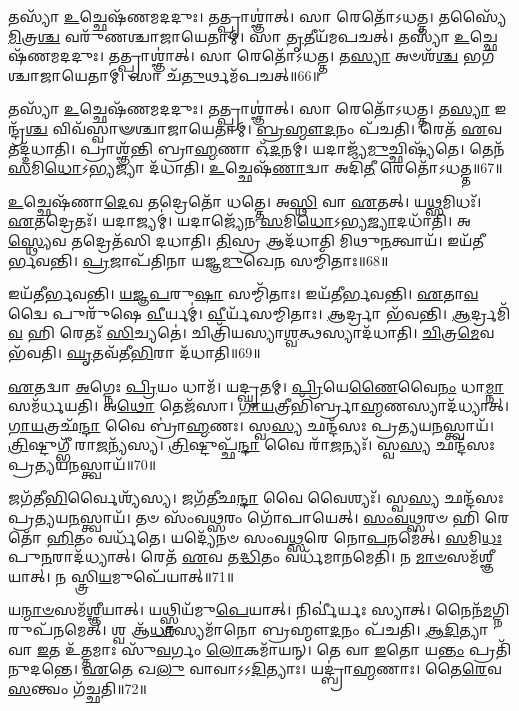 𑌤𑌸𑍍𑌯𑌾᳴ \ul{𑌉}\-𑌚𑍍𑌛𑍇𑌷᳴𑌣𑌮𑌦𑌦𑍁𑌃।
𑌤𑌤𑍍𑌪𑍍𑌰𑌾𑌶𑍍𑌞𑌾॑𑌤𑍍।
𑌸𑌾 𑌰𑍇𑌤𑍋᳴\-𑌽𑌧𑌤𑍍𑌤।
𑌤𑌸𑍍𑌯𑍈᳴ \ul{𑌮𑌿}\-𑌤𑍍𑌰\-\ul{𑌶𑍍𑌚} 𑌵𑌰𑍁᳴𑌣𑌶𑍍𑌚𑌾𑌜𑌾𑌯𑍇𑌤𑌾𑌮𑍍।
𑌸𑌾 \ul{𑌤𑍃}\-𑌤𑍀𑌯᳴𑌮𑌪𑌚𑌤𑍍।
𑌤𑌸𑍍𑌯𑌾᳴ \ul{𑌉}\-𑌚𑍍𑌛𑍇𑌷᳴𑌣𑌮𑌦𑌦𑍁𑌃।
𑌤𑌤𑍍𑌪𑍍𑌰𑌾𑌶𑍍𑌞𑌾॑𑌤𑍍।
𑌸𑌾 𑌰𑍇𑌤𑍋᳴\-𑌽𑌧𑌤𑍍𑌤।
𑌤\-\ul{𑌸𑍍𑌯𑌾} 𑌅𑍞𑌶᳴\-\ul{𑌶𑍍𑌚} 𑌭𑌗᳴𑌶𑍍𑌚𑌾𑌜𑌾𑌯𑍇𑌤𑌾𑌮𑍍।
𑌸𑌾 𑌚᳴\-\ul{𑌤𑍁}\-𑌰𑍍𑌥𑌮᳴𑌪𑌚𑌤𑍍॥66॥

𑌤𑌸𑍍𑌯𑌾᳴ \ul{𑌉}\-𑌚𑍍𑌛𑍇𑌷᳴𑌣𑌮𑌦𑌦𑍁𑌃।
𑌤𑌤𑍍𑌪𑍍𑌰𑌾𑌶𑍍𑌞𑌾॑𑌤𑍍।
𑌸𑌾 𑌰𑍇𑌤𑍋᳴\-𑌽𑌧𑌤𑍍𑌤।
𑌤\-\ul{𑌸𑍍𑌯𑌾} 𑌇𑌨𑍍𑌦𑍍𑌰᳴\-\ul{𑌶𑍍𑌚} 𑌵𑌿𑌵᳴𑌸𑍍𑌵𑌾𑍟𑌶𑍍𑌚𑌾𑌜𑌾𑌯𑍇𑌤𑌾𑌮𑍍।
\-\ul{𑌬𑍍𑌰}\-\-\ul{𑌹𑍍𑌮𑍗}\-\-\ul{𑌦}\-𑌨𑌂 𑌪᳴𑌚𑌤𑌿।
𑌰𑍇𑌤᳴ \ul{𑌏}\-𑌵 𑌤𑌦𑍍𑌦᳴𑌧𑌾𑌤𑌿।
𑌪𑍍𑌰𑌾𑌶𑍍𑌞᳴𑌨𑍍𑌤𑌿 𑌬𑍍𑌰𑌾\-\ul{𑌹𑍍𑌮}\-𑌣𑌾 𑌓᳴\-\ul{𑌦}\-𑌨𑌮𑍍।
𑌯𑌦𑌾𑌜𑍍𑌯᳴\-\ul{𑌮𑍁}\-𑌚𑍍𑌛𑌿𑌷𑍍𑌯᳴𑌤𑍇।
𑌤𑍇𑌨᳴ \ul{𑌸}\-𑌮𑌿\-\ul{𑌧𑍋}\-\-𑌽𑌭𑍍𑌯𑌜𑍍𑌯𑌾 𑌦᳴𑌧𑌾𑌤𑌿।
\-\ul{𑌉}\-𑌚𑍍𑌛𑍇𑌷᳴\-\ul{𑌣𑌾}\-𑌦𑍍𑌵𑌾 𑌅𑌦𑌿᳴\-\ul{𑌤𑍀} 𑌰𑍇𑌤𑍋᳴\-𑌽𑌧𑌤𑍍𑌤॥67॥

\-\ul{𑌉}\-𑌚𑍍𑌛𑍇𑌷᳴𑌣𑌾\-\ul{𑌦𑍇}\-𑌵 𑌤𑌦𑍍𑌰𑍇𑌤𑍋᳴ 𑌧𑌤𑍍𑌤𑍇।
𑌅\-\ul{𑌸𑍍𑌥𑌿} 𑌵𑌾 \ul{𑌏}\-𑌤𑌤𑍍।
𑌯\-\ul{𑌥𑍍𑌸}\-𑌮𑌿𑌧𑌃᳴।
\-\ul{𑌏}\-𑌤𑌦𑍍𑌰𑍇𑌤𑌃᳴।
𑌯𑌦𑌾𑌜𑍍𑌯𑌮𑍍॑।
𑌯𑌦𑌾𑌜𑍍𑌯𑍇᳴𑌨 \ul{𑌸}\-𑌮𑌿\-\ul{𑌧𑍋}\-\-𑌽𑌭𑍍𑌯\-\ul{𑌜𑍍𑌯𑌾}\-𑌦𑌧𑌾᳴𑌤𑌿।
𑌅\-\ul{𑌸𑍍𑌥𑍍𑌯𑍇}\-𑌵 𑌤𑌦𑍍𑌰𑍇𑌤᳴𑌸𑌿 𑌦𑌧𑌾𑌤𑌿।
\-\ul{𑌤𑌿}\-𑌸𑍍𑌰 𑌆𑌦᳴𑌧𑌾𑌤𑌿 𑌮𑌿𑌥𑍁\-\ul{𑌨}\-𑌤𑍍𑌵𑌾𑌯᳴।
𑌇𑌯᳴𑌤𑍀𑌰𑍍𑌭𑌵𑌨𑍍𑌤𑌿।
\-\ul{𑌪𑍍𑌰}\-𑌜𑌾𑌪᳴𑌤𑌿𑌨𑌾 𑌯𑌜𑍍𑌞\-\ul{𑌮𑍁}\-𑌖𑍇\-\ul{𑌨} 𑌸𑌮𑍍𑌮𑌿᳴𑌤𑌾𑌃॥68॥

𑌇𑌯᳴𑌤𑍀𑌰𑍍𑌭𑌵𑌨𑍍𑌤𑌿।
\-\ul{𑌯}\-\-\ul{𑌜𑍍𑌞}\-\-\ul{𑌪}\-𑌰𑍁\-\ul{𑌷𑌾} 𑌸𑌮𑍍𑌮𑌿᳴𑌤𑌾𑌃।
𑌇𑌯᳴𑌤𑍀𑌰𑍍𑌭𑌵𑌨𑍍𑌤𑌿।
\-\ul{𑌏}\-𑌤𑌾\-\ul{𑌵}\-𑌦𑍍𑌵𑍈 𑌪𑍁𑌰𑍁᳴𑌷𑍇 \ul{𑌵𑍀}\-𑌰𑍍𑌯𑌮𑍍॑।
\-\ul{𑌵𑍀}\-𑌰𑍍𑌯᳴𑌸𑌮𑍍𑌮𑌿𑌤𑌾𑌃।
\-\ul{𑌆}\-𑌰𑍍𑌦𑍍𑌰𑌾 𑌭᳴𑌵𑌨𑍍𑌤𑌿।
\-\ul{𑌆}\-𑌰𑍍𑌦𑍍𑌰𑌮𑌿᳴\-\ul{𑌵} 𑌹𑌿 𑌰𑍇𑌤𑌃᳴ \ul{𑌸𑌿}\-𑌚𑍍𑌯𑌤𑍇॑।
𑌚𑌿𑌤𑍍𑌰𑌿᳴𑌯𑌸𑍍𑌯𑌾\-\ul{𑌶𑍍𑌵}\-𑌤𑍍𑌥𑌸𑍍𑌯𑌾𑌦᳴𑌧𑌾𑌤𑌿।
\-\ul{𑌚𑌿}\-𑌤𑍍𑌰\-\ul{𑌮𑍇}\-𑌵 𑌭᳴𑌵𑌤𑌿।
\-\ul{𑌘𑍃}\-𑌤𑌵᳴𑌤𑍀\-\ul{𑌭𑌿}\-𑌰𑌾 𑌦᳴𑌧𑌾𑌤𑌿॥69॥

\-\ul{𑌏}\-𑌤𑌦𑍍𑌵𑌾 \ul{𑌅}\-𑌗𑍍𑌨𑍇𑌃 \ul{𑌪𑍍𑌰𑌿}\-𑌯𑌂 𑌧𑌾𑌮᳴।
𑌯𑌦𑍍\mbox{}\-\ul{𑌘𑍃}\-𑌤𑌮𑍍।
\-\ul{𑌪𑍍𑌰𑌿}\-𑌯𑍇\-\ul{𑌣𑍈}\-𑌵𑍈\-\ul{𑌨𑌂} 𑌧𑌾\-\ul{𑌮𑍍𑌨𑌾} 𑌸𑌮᳴𑌰𑍍𑌧𑌯𑌤𑌿।
𑌅\-\ul{𑌥𑍋} 𑌤𑍇𑌜᳴𑌸𑌾।
\-\ul{𑌗𑌾}\-\-\ul{𑌯}\-𑌤𑍍𑌰𑍀𑌭𑌿᳴𑌰𑍍𑌬𑍍𑌰𑌾\-\ul{𑌹𑍍𑌮}\-𑌣𑌸𑍍𑌯𑌾𑌦᳴𑌧𑍍𑌯𑌾𑌤𑍍।
\-\ul{𑌗𑌾}\-\-\ul{𑌯}\-𑌤𑍍𑌰𑌛᳴\-\ul{𑌨𑍍𑌦𑌾} 𑌵𑍈 𑌬𑍍𑌰𑌾॑\-\ul{𑌹𑍍𑌮}\-𑌣𑌃।
𑌸𑍍𑌵\-\ul{𑌸𑍍𑌯} 𑌛𑌨𑍍𑌦᳴𑌸𑌃 𑌪𑍍𑌰𑌤𑍍𑌯𑌯\-\ul{𑌨}\-𑌸𑍍𑌤𑍍𑌵𑌾𑌯᳴।
\-\ul{𑌤𑍍𑌰𑌿}\-𑌷𑍍𑌟𑍁𑌗𑍍𑌭𑍀᳴ 𑌰𑌾\-\ul{𑌜}\-𑌨𑍍𑌯᳴𑌸𑍍𑌯।
\-\ul{𑌤𑍍𑌰𑌿}\-𑌷𑍍𑌟𑍁𑌪𑍍𑌛᳴\-\ul{𑌨𑍍𑌦𑌾} 𑌵𑍈 𑌰𑌾᳴\-\ul{𑌜}\-𑌨𑍍𑌯𑌃᳴।
𑌸𑍍𑌵\-\ul{𑌸𑍍𑌯} 𑌛𑌨𑍍𑌦᳴𑌸𑌃 𑌪𑍍𑌰𑌤𑍍𑌯𑌯\-\ul{𑌨}\-𑌸𑍍𑌤𑍍𑌵𑌾𑌯᳴॥70॥

𑌜𑌗᳴𑌤𑍀\-\ul{𑌭𑌿}\-𑌰𑍍𑌵𑍈𑌶𑍍𑌯᳴𑌸𑍍𑌯।
𑌜𑌗᳴𑌤𑍀𑌛\-\ul{𑌨𑍍𑌦𑌾} 𑌵𑍈 𑌵𑍈𑌶𑍍𑌯𑌃᳴।
𑌸𑍍𑌵\-\ul{𑌸𑍍𑌯} 𑌛𑌨𑍍𑌦᳴𑌸𑌃 𑌪𑍍𑌰𑌤𑍍𑌯𑌯\-\ul{𑌨}\-𑌸𑍍𑌤𑍍𑌵𑌾𑌯᳴।
𑌤𑍞 𑌸𑌂᳴𑌵\-\ul{𑌥𑍍𑌸}\-𑌰𑌂 𑌗𑍋᳴𑌪𑌾𑌯𑍇𑌤𑍍।
\-\ul{𑌸𑌂}\-\-\ul{𑌵}\-\-\ul{𑌥𑍍𑌸}\-𑌰𑍞 𑌹𑌿 𑌰𑍇𑌤𑍋᳴ \ul{𑌹𑌿}\-𑌤𑌂 𑌵𑌰𑍍𑌧᳴𑌤𑍇।
𑌯𑌦𑍍𑌯𑍇᳴𑌨𑍞 𑌸𑌂𑌵\-\ul{𑌥𑍍𑌸}\-𑌰𑍇 𑌨𑍋\-\ul{𑌪}\-𑌨𑌮𑍇॑𑌤𑍍।
\-\ul{𑌸}\-𑌮𑌿\-\ul{𑌧𑌃} 𑌪𑍁\-\ul{𑌨}\-𑌰𑌾𑌦᳴𑌧𑍍𑌯𑌾𑌤𑍍।
𑌰𑍇𑌤᳴ \ul{𑌏}\-𑌵 𑌤\-\ul{𑌦𑍍𑌧𑌿}\-𑌤𑌂 𑌵𑌰𑍍𑌧᳴𑌮𑌾𑌨𑌮𑍇𑌤𑌿।
𑌨 \ul{𑌮𑌾}\-\-\ul{𑍞}\-𑌸𑌮᳴𑌶𑍍𑌞𑍀𑌯𑌾𑌤𑍍।
𑌨 𑌸𑍍𑌤𑍍𑌰𑌿\-\ul{𑌯}\-𑌮𑍁𑌪𑍇᳴𑌯𑌾𑌤𑍍॥71॥

𑌯\-\ul{𑌨𑍍𑌮𑌾}\-\-\ul{𑍞}\-𑌸𑌮᳴\-\ul{𑌶𑍍𑌞𑍀}\-𑌯𑌾𑌤𑍍।
𑌯𑌥𑍍𑌸𑍍𑌤𑍍𑌰𑌿𑌯᳴𑌮𑍁\-\ul{𑌪𑍇}\-𑌯𑌾𑌤𑍍।
𑌨𑌿𑌰𑍍𑌵𑍀॑𑌰𑍍𑌯𑌃 𑌸𑍍𑌯𑌾𑌤𑍍।
𑌨𑍈𑌨᳴\-\ul{𑌮}\-𑌗𑍍𑌨𑌿𑌰𑍁𑌪᳴𑌨𑌮𑍇𑌤𑍍।
𑌶𑍍𑌵 𑌆᳴\-\ul{𑌧𑌾}\-𑌸𑍍𑌯𑌮𑌾᳴𑌨𑍋 𑌬𑍍𑌰𑌹𑍍𑌮𑍗\-\ul{𑌦}\-𑌨𑌂 𑌪᳴𑌚𑌤𑌿।
\-\ul{𑌆}\-\-\ul{𑌦𑌿}\-𑌤𑍍𑌯𑌾 𑌵𑌾 \ul{𑌇}\-𑌤 𑌉᳴\-\ul{𑌤𑍍𑌤}\-𑌮𑌾𑌃 𑌸𑍁᳴\-\ul{𑌵}\-𑌰𑍍𑌗𑌂 \ul{𑌲𑍋}\-𑌕𑌮𑌾᳴𑌯𑌨𑍍।
𑌤𑍇 𑌵𑌾 \ul{𑌇}\-𑌤𑍋 𑌯\-\ul{𑌨𑍍𑌤𑌂} 𑌪𑍍𑌰𑌤𑌿᳴\-𑌨𑍁𑌦𑌨𑍍𑌤𑍇।
\-\ul{𑌏}\-𑌤𑍇 𑌖\-\ul{𑌲𑍁} 𑌵𑌾𑌵𑌾\-𑌽𑌽\-\ul{𑌦𑌿}\-𑌤𑍍𑌯𑌾𑌃।
𑌯𑌦𑍍𑌬𑍍𑌰𑌾॑\-\ul{𑌹𑍍𑌮}\-𑌣𑌾𑌃।
𑌤𑍈\-\ul{𑌰𑍇}\-𑌵 \ul{𑌸}\-𑌨𑍍𑌤𑍍𑌵𑌂 𑌗᳴𑌚𑍍𑌛𑌤𑌿॥72॥


